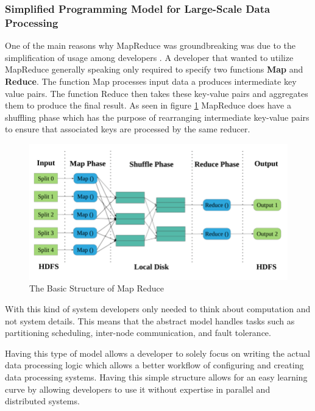 \documentclass[10pt]{proc}
\begin{document}
\subsubsection{Simplified Programming Model for Large-Scale Data Processing} \label{constribution1}
One of the main reasons why MapReduce was groundbreaking was due to the simplification of usage among developers \cite{dean2008mapreduce}. A developer that wanted to utilize MapReduce generally speaking only required to specify two functions \textbf{Map} and \textbf{Reduce}. The function Map processes input data a produces intermediate key value pairs. The function Reduce then takes these key-value pairs and aggregates them to produce the final result. As seen in figure \ref{fig:enter-label} MapReduce does have a shuffling phase which has the purpose of rearranging intermediate key-value pairs to ensure that associated keys are processed by the same reducer.

\begin{figure}[!h]
    \centering
    \includegraphics[width=1\linewidth]{The-Structure-of-MapReduce-Model.png}
    \caption{The Basic Structure of Map Reduce \cite{mapreduceModel2023}}
    \label{fig:enter-label}
\end{figure}

With this kind of system developers only needed to think about computation and not system details. This means that the abstract model handles tasks such as partitioning scheduling, inter-node communication, and fault tolerance.

Having this type of model allows a developer to solely focus on writing the actual data processing logic which allows a better workflow of configuring and creating data processing systems. Having this simple structure allows for an easy learning curve by allowing developers to use it without expertise in parallel and distributed systems.
\end{document}
